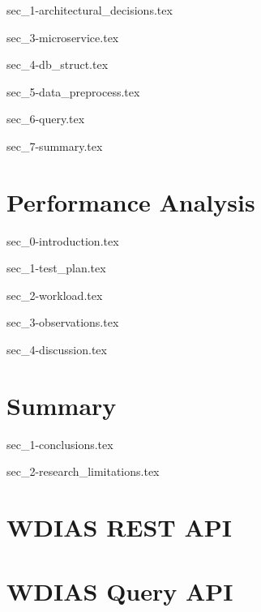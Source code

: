 \documentclass[a4paper,oneside,12pt]{report}
\begin{document}
{sec_1-architectural_decisions.tex}

{sec_3-microservice.tex}

{sec_4-db_struct.tex}

{sec_5-data_preprocess.tex}

{sec_6-query.tex}

{sec_7-summary.tex}

\chapter{Performance Analysis}
\label{ch:results}

{sec_0-introduction.tex}

{sec_1-test_plan.tex}

{sec_2-workload.tex}

{sec_3-observations.tex}

{sec_4-discussion.tex}

\chapter{Summary}
\label{ch:summary}

{sec_1-conclusions.tex}

{sec_2-research_limitations.tex}


\graphicspath{ {./images/} }

% 
% 

\printbibliography[title={References}]

\begin{appendices}
    \chapter{WDIAS REST API}
    
    \chapter{WDIAS Query API}
    
\end{appendices}

% 
% 
\end{document}
